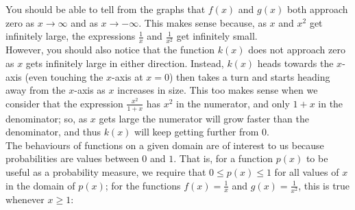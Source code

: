 \noindent You should be able to tell from the graphs that $f(x)$ and $g(x)$ both approach zero as $x \rightarrow \infty$ and as $x \rightarrow -\infty$. This makes sense because, as $x$ and $x^2$ get infinitely large, the expressions $\frac{1}{x}$ and $\frac{1}{x^2}$ get infinitely small. \\

\noindent However, you should also notice that the function $k(x)$ does not approach zero as $x$ gets infinitely large in either direction. Instead, $k(x)$ heads towards the $x$-axis (even touching the $x$-axis at $x = 0$) then takes a turn and starts heading away from the $x$-axis as $x$ increases in size. This too makes sense when we consider that the expression $\frac{x^2}{1+x}$ has $x^2$ in the numerator, and only $1+x$ in the denominator; so, as $x$ gets large the numerator will grow faster than the denominator, and thus $k(x)$ will keep getting further from $0$. \\

\noindent The behaviours of functions on a given domain are of interest to us because probabilities are values between $0$ and $1$. That is, for a function $p(x)$ to be useful as a probability measure, we require that $0 \leq p(x) \leq 1$ for all values of $x$ in the domain of $p(x)$; for the functions $f(x) = \frac{1}{x}$ and $g(x) = \frac{1}{x^2}$, this is true whenever $x \geq 1$:

